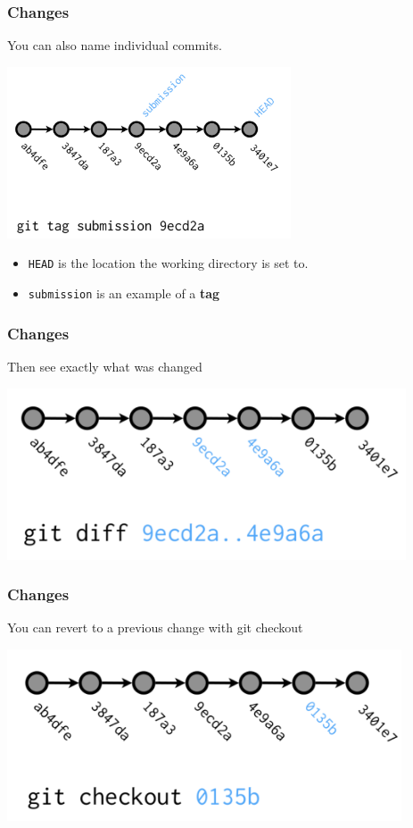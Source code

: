   \begin{frame}[t]
    \frametitle{Changes}
    You can also name individual commits.
    \begin{center}
      \includegraphics[height=2.00in]{./images/from-wickham-03} 
    \end{center} 

    \begin{itemize} 
      \item {\tt HEAD} is the location the working directory is set to.
      \item {\tt submission} is an example of a {\bf tag}
    \end{itemize} 
  \end{frame}

  \begin{frame}[t]
    \frametitle{Changes}
    Then see exactly what was changed 
    \begin{center}
      \includegraphics[height=2.00in]{./images/from-wickham-04} 
    \end{center} 
  \end{frame}

  \begin{frame}[t]
    \frametitle{Changes}
    You can revert to a previous change with git checkout
    \begin{center}
      \includegraphics[height=2.00in]{./images/from-wickham-05} 
    \end{center} 
  \end{frame}


